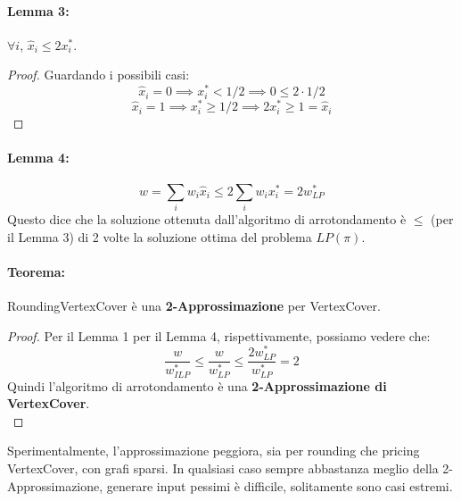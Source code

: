 \newpage

\paragraph{Lemma 3:} $\forall i$, $\hat{x}_i \leq 2x_i^\ast$.\\

\begin{proof}
	Guardando i possibili casi: 
	$$ \hat{x}_i = 0 \implies x_i^\ast < 1/2 \implies 0 \leq 2 \cdot 1/2 $$
	$$ \hat{x}_i = 1 \implies x_i^\ast \geq 1/2 \implies 2x_i^\ast \geq 1 = \hat{x}_i $$
\end{proof}

\paragraph{Lemma 4:}
$$ w = \sum_i w_i \hat{x}_i \leq 2 \sum_i w_i x_i^\ast = 2 w_{LP}^\ast $$
Questo dice che la soluzione ottenuta dall'algoritmo di arrotondamento è $\leq$ (per il Lemma 3) di 2 volte la soluzione ottima del problema $LP(\pi)$.\\

\paragraph{Teorema:} RoundingVertexCover è una \textbf{2-Approssimazione} per VertexCover.\\

\begin{proof}
	Per il Lemma 1  per il Lemma 4, rispettivamente, possiamo vedere che:
	$$ \frac{w}{w_{ILP}^\ast} \leq \frac{w}{w_{LP}^\ast} \leq \frac{2 w^\ast_{LP}}{w^\ast_{LP}} = 2$$
	Quindi l'algoritmo di arrotondamento è una \textbf{2-Approssimazione di VertexCover}.\\
\end{proof}


\vfill

Sperimentalmente, l'approssimazione peggiora, sia per rounding che pricing VertexCover, con grafi sparsi. In qualsiasi caso sempre abbastanza meglio della 2-Approssimazione, generare input pessimi è difficile, solitamente sono casi estremi.\\

\newpage